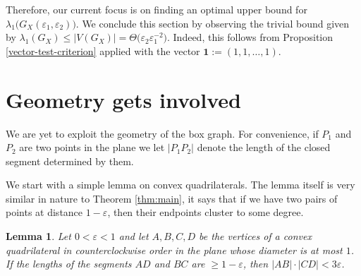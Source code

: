 \documentclass[12pt]{article}
\newtheorem{lem}[thm]{Lemma}
\newcommand{\eps}{\varepsilon}
\begin{document}


Therefore, our current focus is on finding an optimal upper bound for $\lambda_1\big(G_X(\eps_1,\eps_2)\big)$.
We conclude this section by observing the trivial bound given by $\lambda_1(G_X)\leq |V(G_X)|=\Theta\big(\varepsilon_2 \varepsilon_1^{-2}\big)$. Indeed, this follows from Proposition \ref{vector-test-criterion} applied with the vector $\mathbf{1}:=(1,1,\ldots,1)$.

\section{Geometry gets involved}\label{sec:geom}
We are yet to exploit the geometry of the box graph. For convenience, if $P_1$ and $P_2$ are two points in the plane we let $|P_1P_2|$ denote the length of the closed segment determined by them.

 We start with a simple lemma on convex quadrilaterals. The lemma itself is very similar in nature to Theorem \ref{thm:main}, it says that if we have two pairs of points at distance $1-\varepsilon$, then their endpoints cluster to some degree. 

\begin{lem}\label{quadrilateral}
    Let $0<\varepsilon<1$ and let $A,B,C,D$ be the vertices of a convex quadrilateral in counterclockwise order in the plane whose diameter is at most $1$. If the lengths of the segments $AD$ and $BC$ are $\geq 1-\varepsilon$, then $|AB|\cdot |CD|<3\varepsilon$. 
\end{lem}
\end{document}
